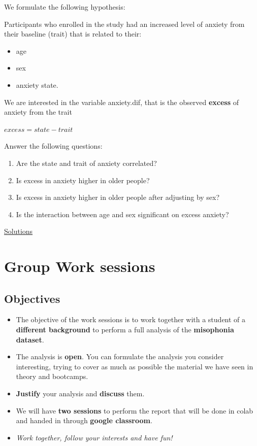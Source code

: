 \documentclass[
]{book}
\providecommand{\tightlist}{%
  \setlength{\itemsep}{0pt}\setlength{\parskip}{0pt}}
\begin{document}
We formulate the following hypothesis:

Participants who enrolled in the study had an increased level of anxiety from their baseline (trait) that is related to their:

\begin{itemize}
\tightlist
\item
  age
\item
  sex
\item
  anxiety state.
\end{itemize}

We are interested in the variable anxiety.dif, that is the observed \textbf{excess} of anxiety from the trait

\(excess = state - trait\)

Answer the following questions:

\begin{enumerate}
\def\labelenumi{\arabic{enumi}.}
\item
  Are the state and trait of anxiety correlated?
\item
  Is excess in anxiety higher in older people?
\item
  Is excess in anxiety higher in older people after adjusting by sex?
\item
  Is the interaction between age and sex significant on excess anxiety?
\end{enumerate}

\href{https://colab.research.google.com/drive/14i2h9AYxHh4KIfxBB9Px7VwnYdSFVBq5?usp=sharing}{Solutions}

\hypertarget{group-work-sessions}{%
\chapter{Group Work sessions}\label{group-work-sessions}}

\hypertarget{objectives}{%
\section{Objectives}\label{objectives}}

\begin{itemize}
\item
  The objective of the work sessions is to work together with a student of a \textbf{different background} to perform a full analysis of the \textbf{misophonia dataset}.
\item
  The analysis is \textbf{open}. You can formulate the analysis you consider interesting, trying to cover as much as possible the material we have seen in theory and bootcamps.
\item
  \textbf{Justify} your analysis and \textbf{discuss} them.
\item
  We will have \textbf{two sessions} to perform the report that will be done in colab and handed in through \textbf{google classroom}.
\item
  \emph{Work together, follow your interests and have fun!}
\end{itemize}
\end{document}
